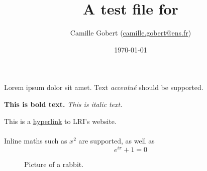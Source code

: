 \documentclass[11pt]{article}
\title{A test file for \iLaTeX}
\author{Camille Gobert (\url{camille.gobert@ens.fr})}
\date{\today}
\begin{document}
    \maketitle
    
    Lorem ipsum dolor sit amet.
    Text \emph{accentu\'e} should be supported.
    
    \textbf{This is bold text.}
    \textit{This is italic text.}
    
    This is a \href{https://www.lri.fr/}{hyperlink} to LRI's website.
    
    \paragraph{}
    Inline maths such as $x^2$ are supported, as well as 
    $$e^{i\pi} + 1 = 0$$
    
    \begin{table}[h]
        \centering
        \caption{Random table.}
        \label{tab:random}
    \end{table}

    \begin{figure}[h]
        \centering
        \caption{Picture of a rabbit.}
        \label{fig:rabbit2}
    \end{figure}
\end{document}
